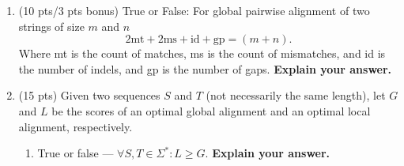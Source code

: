 \documentclass[11pt, oneside]{article}   	%
\begin{document}
\begin{enumerate}
\clearpage
\item \dag (10 pts/3 pts bonus) True or False: For global pairwise alignment of two strings of size $m$ and $n$
\[2\text{mt} + 2\text{ms} + \text{id} + \text{gp} = (m+n).\] 
Where mt is the count of matches, ms is the count of mismatches, and id is the number of indels, and gp is the number of gaps.
\textbf{Explain your answer.}  

\clearpage
\item (15 pts)
Given two sequences $S$ and $T$ (not necessarily the same length), 
let $G$ and $L$ be the scores of an optimal global alignment and an optimal local alignment, respectively.
\begin{enumerate}
\item True or false ---  $\forall S,T\in\Sigma^*: L \ge G$. \textbf{Explain your answer.}  

\end{enumerate}

\end{enumerate}
\end{document}
